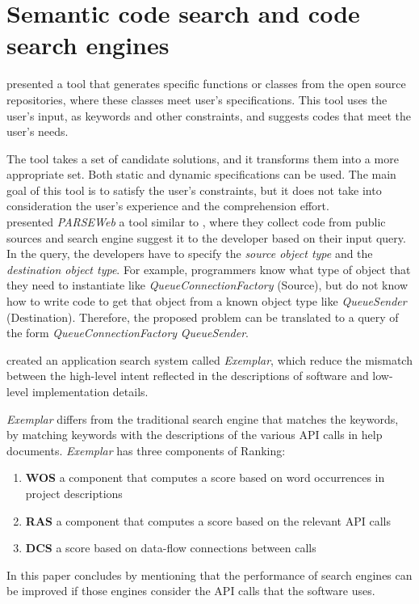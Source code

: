 \documentclass[12pt,mscthesis]{usiinfthesis}
\begin{document}
	\section{Semantic code search and code search engines }

	\citet{Reiss:2009:SCS:1555001.1555040} presented a tool that generates specific functions or classes from the open source repositories, where these classes meet user's specifications. This tool uses the user's input, as keywords and other constraints, and suggests codes that meet the user's needs.


	The tool takes a set of candidate solutions, and it transforms them into a more appropriate set. Both static and dynamic specifications can be used. The main goal of this tool is to satisfy the user's constraints, but it does not take into consideration the user's experience and the comprehension effort.\\
	

	\citet{Thummalapenta:2007:PPA:1321631.1321663} presented \emph{PARSEWeb} a tool similar to \citet{Reiss:2009:SCS:1555001.1555040}, where they collect code from public sources and search engine suggest it to the developer based on their input query. In the query, the developers have to specify the \textit{source object type} and the \textit{destination object type}.  For example, programmers know what type of object that they need to instantiate like \emph{QueueConnectionFactory} (Source), but do not know how to write code to get that object from a known object type like \emph{QueueSender} (Destination). Therefore, the proposed problem can be translated to a query of the form \emph{QueueConnectionFactory} \rightarrow \emph{QueueSender}.

	\citet{McMillan:2011:FRF:1985793.1986032} created an application search system called \textit{Exemplar}, which reduce the mismatch between the high-level intent reflected in the descriptions of software and low-level implementation details.

	 \textit{Exemplar} differs from the traditional search engine that matches the keywords, by matching keywords with the descriptions of the various API calls in help documents.
	\textit{Exemplar} has three components of Ranking: 
	\begin{enumerate}
		\item \textbf{WOS} a component that computes a score based on word occurrences in project descriptions
		\item \textbf{RAS} a component that computes a score based on the relevant API calls
		\item \textbf{DCS} a score based on data-flow connections between calls
	\end{enumerate}
	In this paper \citet{McMillan:2011:FRF:1985793.1986032} concludes by mentioning that the performance of search engines can be improved if those engines consider the API calls that the software uses.\\
\end{document}
